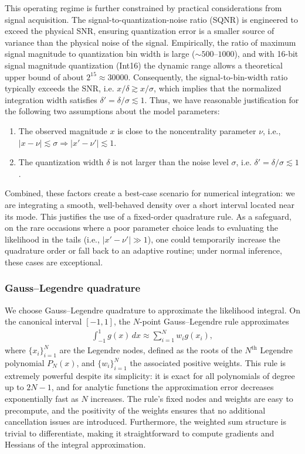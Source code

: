 \documentclass{article}
\begin{document}
This operating regime is further constrained by practical considerations from signal acquisition.
The signal-to-quantization-noise ratio (SQNR) is engineered to exceed the physical SNR, ensuring quantization error is a smaller source of variance than the physical noise of the signal.
Empirically, the ratio of maximum signal magnitude to quantization bin width is large ($\sim\!500\text{--}1000$), and with 16-bit signal magnitude quantization (Int16) the dynamic range allows a theoretical upper bound of about $2^{15} \approx 30000$.
Consequently, the signal-to-bin-width ratio typically exceeds the SNR, i.e. $x/\delta \gtrsim x/\sigma$, which implies that the normalized integration width satisfies $\delta' = \delta/\sigma \lesssim 1$.
Thus, we have reasonable justification for the following two assumptions about the model parameters:
%
\begin{enumerate}
  \item The observed magnitude $x$ is close to the noncentrality parameter $\nu$, i.e., $|x - \nu| \lesssim \sigma \Rightarrow |x' - \nu'| \lesssim 1$.
  \item The quantization width $\delta$ is not larger than the noise level $\sigma$, i.e. $\delta' = \delta / \sigma \lesssim 1$.
\end{enumerate}
%
Combined, these factors create a best-case scenario for numerical integration:
we are integrating a smooth, well-behaved density over a short interval located near its mode.
This justifies the use of a fixed-order quadrature rule.
As a safeguard, on the rare occasions where a poor parameter choice leads to evaluating the likelihood in the tails (i.e., $|x'-\nu'| \gg 1$), one could temporarily increase the quadrature order or fall back to an adaptive routine;
under normal inference, these cases are exceptional.

\subsubsection{Gauss--Legendre quadrature}

We choose Gauss--Legendre quadrature to approximate the likelihood integral.
On the canonical interval $[-1,1]$, the $N$-point Gauss--Legendre rule approximates
%
\begin{align}
  \int_{-1}^{1} g(x) \, dx \approx \sum_{i=1}^{N} w_i g(x_i),
\end{align}
%
where $\{x_i\}_{i=1}^N$ are the Legendre nodes, defined as the roots of the $N^\text{th}$ Legendre polynomial $P_N(x)$, and $\{w_i\}_{i=1}^N$ the associated positive weights.
This rule is extremely powerful despite its simplicity:
it is exact for all polynomials of degree up to $2N-1$, and for analytic functions the approximation error decreases exponentially fast as $N$ increases.
The rule's fixed nodes and weights are easy to precompute, and the positivity of the weights ensures that no additional cancellation issues are introduced.
Furthermore, the weighted sum structure is trivial to differentiate, making it straightforward to compute gradients and Hessians of the integral approximation.
\end{document}
